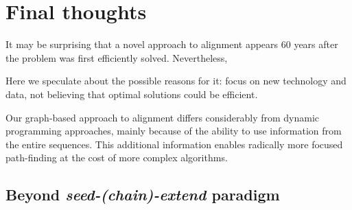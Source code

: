 \section*{Final thoughts}

It may be surprising that a novel approach to alignment appears 60 years after
the problem was first efficiently solved. Nevertheless, 

Here we speculate about the possible
reasons for it: focus on new technology and data, not believing that optimal
solutions could be efficient.

Our graph-based approach to alignment differs considerably from dynamic
programming approaches, mainly because of the ability to use information from the
entire sequences. This additional information enables radically more focused
path-finding at the cost of more complex algorithms.

\subsection*{Beyond \emph{seed-(chain)-extend} paradigm}

